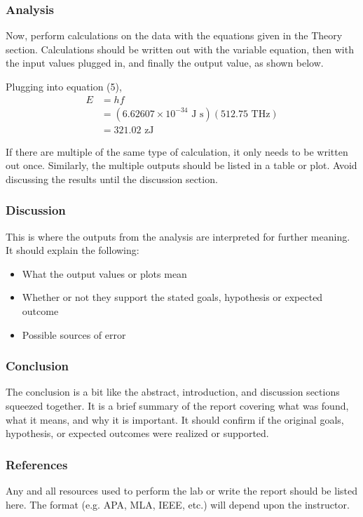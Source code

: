 \documentclass{bannerReport}
\begin{document}
			\subsubsection{Analysis}
				Now, perform calculations on the data with the equations given in the Theory section. Calculations should be written out with the variable equation, then with the input values plugged in, and finally the output value, as shown below.
				\begin{dent}
					Plugging into equation (5),
					\begin{equation*}
						\begin{aligned}
							E &= hf \\
							&= (6.62607 \times 10^{-34} {\text{ J s}})(512.75 \text{ THz})\\
							&= 321.02 \text{ zJ}
						\end{aligned}
					\end{equation*}
				\end{dent}
				If there are multiple of the same type of calculation, it only needs to be written out once. Similarly, the multiple outputs should be listed in a table or plot. Avoid discussing the results until the discussion section.

			\subsubsection{Discussion}
				This is where the outputs from the analysis are interpreted for further meaning. It should explain the following:
				\begin{itemize}
				\item What the output values or plots mean
				\item Whether or not they support the stated goals, hypothesis or expected outcome
				\item Possible sources of error
				\end{itemize}

			\subsubsection{Conclusion}
				The conclusion is a bit like the abstract, introduction, and discussion sections squeezed together. It is a brief summary of the report covering what was found, what it means, and why it is important. It should confirm if the original goals, hypothesis, or expected outcomes were realized or supported.

			\subsubsection{References}
				Any and all resources used to perform the lab or write the report should be listed here. The format (e.g. APA, MLA, IEEE, etc.) will depend upon the instructor.
\end{document}

